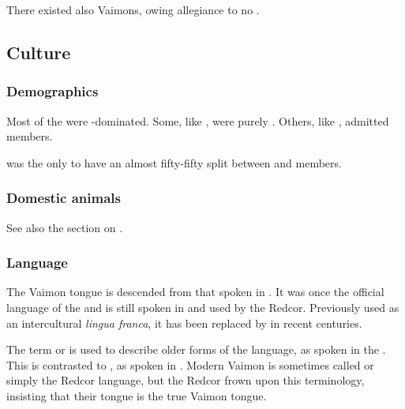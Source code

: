 There existed also  Vaimons, owing allegiance to no \vclan.









\subsection{Culture}





\subsubsection{Demographics}
Most of the \VaimonClans were \human{}-dominated. 
Some, like \ClanRedcor, were purely \human. 
Others, like \ClanGeican, admitted \scathaese{} members. 

\ClanTelcra{} was the only \vclan to have an almost fifty-fifty split between \human{} and \scatha{} members. 





\subsubsection{Domestic animals}
See also the section on . 





\subsubsection{Language}
The Vaimon tongue is descended from that spoken in . 
It was once the official language of the  and is still spoken in \Redce{} and used by the Redcor. 
Previously used as an intercultural \emph{lingua franca}, it has been replaced by \Velcadian{} in recent centuries. 

The term  or  is used to describe older forms of the language, as spoken in the \VaimonCaliphate. 
This is contrasted to , as spoken in \Redce. 
Modern Vaimon is sometimes called  or simply the Redcor language, but the Redcor frown upon this terminology, insisting that their tongue is the true Vaimon tongue. 

